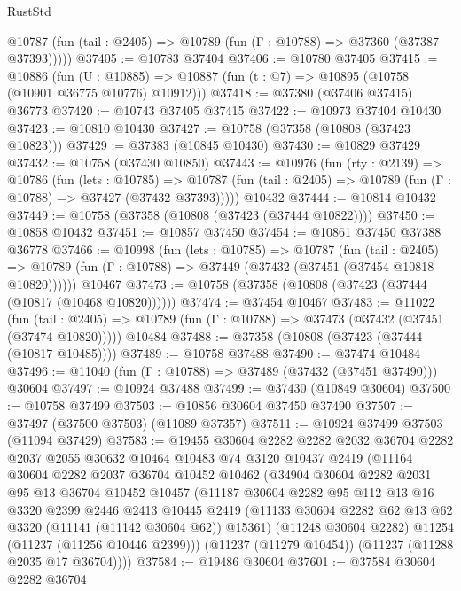 \begin{lexlean}{RustStd}
\begin{coremodule}
      @10787 (fun (tail : @2405) => @10789 (fun (Γ : @10788) => @37360 (@37387 @37393)))))
@37405 := @10783 @37404
@37406 := @10780 @37405
@37415 := @10886
    (fun (U : @10885) => @10887 (fun (t : @7) => @10895 (@10758 (@10901 @36775 @10776) @10912)))
@37418 := @37380 (@37406 @37415) @36773
@37420 := @10743 @37405 @37415
@37422 := @10973 @37404 @10430
@37423 := @10810 @10430
@37427 := @10758 (@37358 (@10808 (@37423 @10823)))
@37429 := @37383 (@10845 @10430)
@37430 := @10829 @37429
@37432 := @10758 (@37430 @10850)
@37443 := @10976
    (fun (rty : @2139) =>
    @10786
      (fun (lets : @10785) =>
      @10787 (fun (tail : @2405) => @10789 (fun (Γ : @10788) => @37427 (@37432 @37393)))))
    @10432
@37444 := @10814 @10432
@37449 := @10758 (@37358 (@10808 (@37423 (@37444 @10822))))
@37450 := @10858 @10432
@37451 := @10857 @37450
@37454 := @10861 @37450 @37388 @36778
@37466 := @10998
    (fun (lets : @10785) =>
    @10787
      (fun (tail : @2405) =>
      @10789 (fun (Γ : @10788) => @37449 (@37432 (@37451 (@37454 @10818 @10820))))))
    @10467
@37473 := @10758 (@37358 (@10808 (@37423 (@37444 (@10817 (@10468 @10820))))))
@37474 := @37454 @10467
@37483 := @11022
    (fun (tail : @2405) => @10789 (fun (Γ : @10788) => @37473 (@37432 (@37451 (@37474 @10820)))))
    @10484
@37488 := @37358 (@10808 (@37423 (@37444 (@10817 @10485))))
@37489 := @10758 @37488
@37490 := @37474 @10484
@37496 := @11040 (fun (Γ : @10788) => @37489 (@37432 (@37451 @37490))) @30604
@37497 := @10924 @37488
@37499 := @37430 (@10849 @30604)
@37500 := @10758 @37499
@37503 := @10856 @30604 @37450 @37490
@37507 := @37497 (@37500 @37503) (@11089 @37357)
@37511 := @10924 @37499 @37503 (@11094 @37429)
@37583 := @19455
    @30604
    @2282
    @2282
    @2032
    @36704
    @2282
    @2037
    @2055
    @30632
    @10464
    @10483
    @74
    @3120
    @10437
    @2419
    (@11164
      @30604
      @2282
      @2037
      @36704
      @10452
      @10462
      (@34904
        @30604
        @2282
        @2031
        @95
        @13
        @36704
        @10452
        @10457
        (@11187
          @30604
          @2282
          @95
          @112
          @13
          @16
          @3320
          @2399
          @2446
          @2413
          @10445
          @2419
          (@11133 @30604 @2282 @62 @13 @62 @3320 (@11141 (@11142 @30604 @62)) @15361)
          (@11248 @30604 @2282)
          @11254
          (@11237 (@11256 @10446 @2399)))
        (@11237 (@11279 @10454))
        (@11237 (@11288 @2035 @17 @36704))))
@37584 := @19486 @30604
@37601 := @37584
    @30604
    @2282
    @36704

\end{coremodule}
\end{lexlean}
